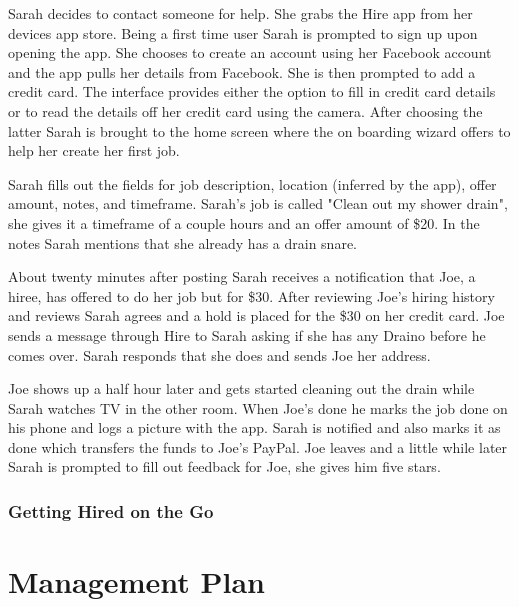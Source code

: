 \documentclass[11pt]{article}
\begin{document}
Sarah decides to contact someone for help. She grabs the Hire app from her devices app store. Being a first time user Sarah is prompted to sign up upon opening the app. She chooses to create an account using her Facebook account and the app pulls her details from Facebook. She is then prompted to add a credit card. The interface provides either the option to fill in credit card details or to read the details off her credit card using the camera. After choosing the latter Sarah is brought to the home screen where the on boarding wizard offers to help her create her first job. 

Sarah fills out the fields for job description, location (inferred by the app), offer amount, notes, and timeframe. Sarah's job is called "Clean out my shower drain", she gives it a timeframe of a couple hours and an offer amount of \$20. In the notes Sarah mentions that she already has a drain snare.

About twenty minutes after posting Sarah receives a notification that Joe, a hiree, has offered to do her job but for \$30. After reviewing Joe's hiring history and reviews Sarah agrees and a hold is placed for the \$30 on her credit card. Joe sends a message through Hire to Sarah asking if she has any Draino before he comes over. Sarah responds that she does and sends Joe her address. 

Joe shows up a half hour later and gets started cleaning out the drain while Sarah watches TV in the other room. When Joe's done he marks the job done on his phone and logs a picture with the app. Sarah is notified and also marks it as done which transfers the funds to Joe's PayPal. Joe leaves and a little while later Sarah is prompted to fill out feedback for Joe, she gives him five stars.

\subsubsection{Getting Hired on the Go}



%
\section{Management Plan}\label{management-plan}
\end{document}
